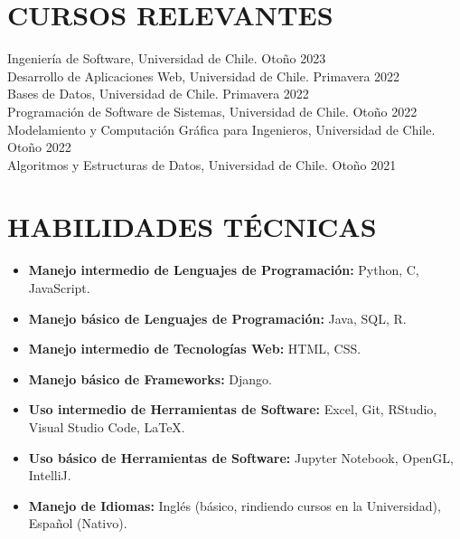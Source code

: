 \documentclass[a4paper, 10pt]{extarticle}
\begin{document}
\section*{CURSOS RELEVANTES}
\noindent
Ingeniería de Software, Universidad de Chile. \hfill Otoño 2023\\[2pt]
Desarrollo de Aplicaciones Web, Universidad de Chile. \hfill Primavera 2022\\[2pt]
Bases de Datos, Universidad de Chile. \hfill Primavera 2022\\[2pt]
Programación de Software de Sistemas, Universidad de Chile. \hfill Otoño 2022\\[2pt]
Modelamiento y Computación Gráfica para Ingenieros, Universidad de Chile. \hfill Otoño 2022\\[2pt]
Algoritmos y Estructuras de Datos, Universidad de Chile. \hfill Otoño 2021

\section*{HABILIDADES TÉCNICAS}
\begin{itemize}
    \item \textbf{Manejo intermedio de Lenguajes de Programación:} Python, C, JavaScript.
    \item \textbf{Manejo básico de Lenguajes de Programación:} Java, SQL, R.
    \item \textbf{Manejo intermedio de Tecnologías Web:} HTML, CSS.
    \item \textbf{Manejo básico de Frameworks:} Django.
    \item \textbf{Uso intermedio de Herramientas de Software:} Excel, Git, RStudio, Visual Studio Code, LaTeX.
    \item \textbf{Uso básico de Herramientas de Software:}  Jupyter Notebook, OpenGL, IntelliJ.
    \item \textbf{Manejo de Idiomas:}  Inglés (básico, rindiendo cursos en la Universidad), Español (Nativo).
\end{itemize}

\end{document}

